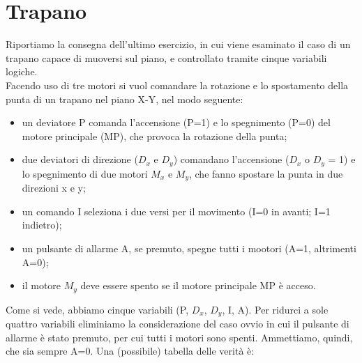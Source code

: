 \documentclass[journal, a4paper]{IEEEtran}
\begin{document}
\section{Trapano}
Riportiamo la consegna dell'ultimo esercizio, in cui viene esaminato il caso di un trapano capace di muoversi sul piano, e controllato tramite cinque variabili logiche.\\

Facendo uso di tre motori si vuol comandare la rotazione e lo spostamento della punta di un trapano nel piano X-Y, nel modo seguente:
\begin{itemize}
\item un deviatore P comanda l'accensione (P=1) e lo spegnimento (P=0) del motore principale (MP), che provoca la rotazione della punta;

\item due deviatori di direzione ($D_x$ e $D_y$) comandano l'accensione ($D_x$ o $D_y$ = 1) e lo spegnimento di due motori $M_x$ e $M_y$, che fanno spostare la punta in due direzioni x e y;

\item un comando I seleziona i due versi per il movimento (I=0 in avanti; I=1 indietro);

\item un pulsante di allarme A, se premuto, spegne tutti i mootori (A=1, altrimenti A=0);

\item il motore $M_y$ deve essere spento se il motore principale MP è acceso.
\end{itemize}

Come si vede, abbiamo cinque variabili (P, $D_x$, $D_y$, I, A). Per ridurci a sole quattro variabili eliminiamo la considerazione del caso ovvio in cui il pulsante di allarme è stato premuto, per cui tutti i motori sono spenti. Ammettiamo, quindi, che sia sempre A=0. Una (possibile) tabella delle verità è:
\end{document}
